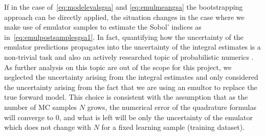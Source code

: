 \vspace{0.2cm}\noindent
If in the case of~\eqref{eq:modelevalsgsa} and \eqref{eq:emulmeangsa} the bootstrapping approach can be directly applied, the situation changes in the case where we make use of emulator samples to estimate the Sobol' indices as in~\eqref{eq:emulpostsamplesgsa1}. In fact, quantifying how the uncertainty of the emulator predictions propagates into the uncertainty of the integral estimates is a non-trivial task and also an actively researched topic of probabilistic numerics . As further analysis on this topic are out of the scope for this project, we neglected the uncertainty arising from the integral estimates and only considered the uncertainty arising from the fact that we are using an emultor to replace the true forward model. This choice is consistent with the assumption that as the number of MC samples $N$ grows, the numerical error of the quadrature formulas will converge to $0$, and what is left will be only the uncertainty of the emulator which does not change with $N$ for a fixed learning sample (training dataset).